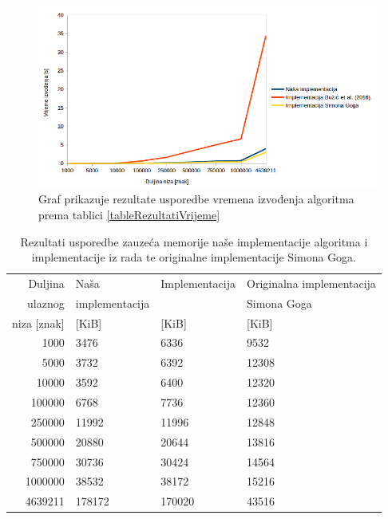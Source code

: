\documentclass[times, utf8, seminar]{fer}
\begin{document}
\begin{figure}
 \begin{center}
 		\includegraphics[width=\columnwidth]{prvi.png}
 		\caption{Graf prikazuje rezultate usporedbe vremena izvođenja algoritma prema tablici \ref{tableRezultatiVrijeme}}
 		\label{fig:graf1}
 \end{center}
\end{figure}


\begin{table}
\caption{Rezultati usporedbe zauzeća memorije naše implementacije algoritma i implementacije iz rada \cite{studenti2016} te originalne implementacije Simona Goga.}
\label{tableRezultatiMemorija}
\begin{center}
\begin{tabular}{rlll}
\toprule
Duljina & Naša & Implementacija & Originalna implementacija \\
ulaznog & implementacija & \cite{studenti2016} & Simona Goga \\
niza   [znak] &  [KiB] &  [KiB] &  [KiB]\\

\midrule
1000 & 3476 & 6336 & 9532\\
5000 & 3732 &  6392 & 12308 \\
10000 & 3592 & 6400 & 12320 \\
100000 & 6768 & 7736 & 12360 \\
250000 & 11992 & 11996 & 12848 \\
500000 & 20880 & 20644 & 13816\\
750000 & 30736 & 30424 & 14564\\
1000000 & 38532 & 38172 & 15216 \\
4639211 & 178172 & 170020 & 43516\\
\bottomrule
\end{tabular}
\end{center}
\end{table}
\end{document}
